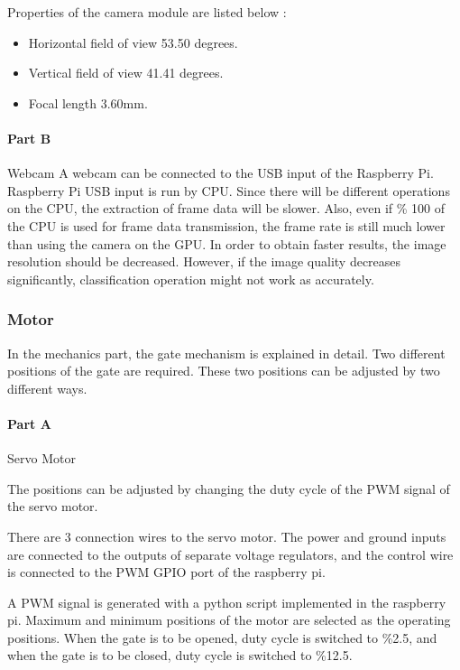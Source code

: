  Properties of the camera module are listed below \cite{cite:picammod}:
 
\begin{itemize}
\item Horizontal field of view 53.50 degrees.
\item Vertical field of view 41.41 degrees.
\item Focal length 3.60mm.
\end{itemize}
 
 
 \paragraph{Part B} Webcam
 A webcam can be connected to the USB input of the Raspberry Pi. Raspberry Pi USB input is run by CPU. Since there will be different operations on the CPU, the extraction of frame data will be slower. Also, even if \% 100 of the CPU is used for frame data transmission, the frame rate is still much lower than using the camera on the GPU. In order to obtain faster results, the image resolution should be decreased. However, if the image quality decreases significantly, classification operation might not work as accurately.
 

  \subsubsection{Motor}
  
    In the mechanics part, the gate mechanism is explained in detail. Two different positions of the gate are required. These two positions can be adjusted by two different ways.
 
 \paragraph{Part A} Servo Motor
  
  The positions can be adjusted by changing the duty cycle of the PWM signal of the servo motor.
  
  There are 3 connection wires to the servo motor. The power and ground inputs are connected to the outputs of separate voltage regulators, and the control wire is connected to the PWM GPIO port of the raspberry pi.
  
  A PWM signal is generated with a python script implemented in the raspberry pi. Maximum and minimum positions of the motor are selected as the operating positions. When the gate is to be opened, duty cycle is switched to \%2.5, and when the gate is to be closed, duty cycle is switched to \%12.5.
  
